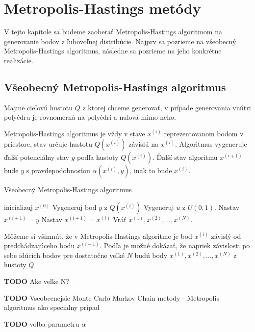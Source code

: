 \chapter{Metropolis-Hastings metódy}

V tejto kapitole sa budeme zaoberať Metropolis-Hastings algoritmom na generovanie bodov z ľubovoľnej distribúcie. Najprv sa pozrieme na všeobecný Metropolis-Hastings algoritmus, následne sa pozrieme na jeho konkrétne realizácie.

\section{Všeobecný Metropolis-Hastings algoritmus}

Majme cieľovú hustotu $Q$ z ktorej chceme generovať, v prípade generovania vnútri polyédru je rovnomerná na polyédri a nulová mimo neho.

Metropolis-Hastings algoritmus je vždy v stave $x^{(i)}$ reprezentovanom bodom v priestore, stav určuje hustotu $Q(x^{(i)})$ závislú na $x^{(i)}$. Algoritmus vygeneruje ďalší potenciálny stav $y$ podľa hustoty $Q(x^{(i)})$. Ďalší stav algoritmu $x^{(i+1)}$ bude $y$ s pravdepodobnosťou $\alpha (x^{(i)},y)$, inak to bude $x^{(i)}$.

\begin{algorithm}[H]
	\caption{Všeobecný Metropolis-Hastings algoritmus \cite{metropolis-hastings_chib}}
	\label{metropolis-hastings}
	\begin{algorithmic}[1]
		\State inicializuj $x^{(0)}$
			\State Vygeneruj bod $y$ z $Q(x^{(i)})$
			\State Vygeneruj $u$ z $U(0,1)$.
				\State Nastav $x^{(i+1)}=y$
			\Else
				\State Nastav $x^{(i+1)}=x^{(i)}$
			\EndIf
		\EndFor
		\State Vráť ${x^{(1)},x^{(2)},\dots,x^{(N)}}$.
	\end{algorithmic}
\end{algorithm}

Môžeme si všimnúť, že v Metropolis-Hastings algoritme je bod $x^{(i)}$ závislý od predchádzajúceho bodu $x^{(i-1)}$. Podľa \cite{metropolis-hastings_chib} je možné dokázať, že napriek závislosti po sebe idúcich bodov pre dostatočne veľké $N$ budú body ${x^{(1)},x^{(2)},\dots,x^{(N)}}$ z hustoty $Q$.

\textbf{TODO} Ake velke N?

\textbf{TODO} Vseobecnejsie Monte Carlo Markov Chain metody - Metropolis algoritmus ako specialny pripad

\textbf{TODO} volba parametru $\alpha$
